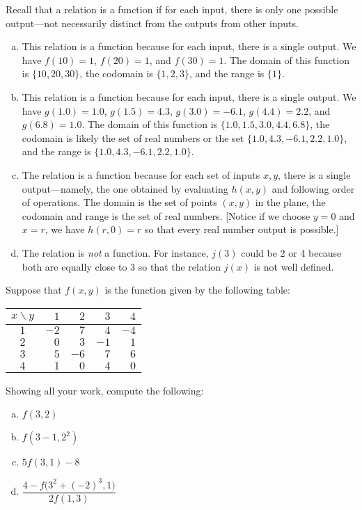 \documentclass[11pt,letterpaper]{article}
\begin{document}
\sol Recall that a relation is a function if for each input, there is only one possible output---not necessarily distinct from the outputs from other inputs. 

\begin{enumerate}[(a)]
\item This relation is a function because for each input, there is a single output. We have $f(10)= 1$, $f(20)= 1$, and $f(30)= 1$. The domain of this function is $\{ 10, 20, 30 \}$, the codomain is $\{ 1, 2, 3 \}$, and the range is $\{ 1 \}$. 

\item This relation is a function because for each input, there is a single output. We have $g(1.0)= 1.0$, $g(1.5)= 4.3$, $g(3.0)= -6.1$, $g(4.4)= 2.2$, and $g(6.8)= 1.0$. The domain of this function is $\{ 1.0, 1.5, 3.0, 4.4, 6.8 \}$, the codomain is likely the set of real numbers or the set $\{ 1.0, 4.3, -6.1, 2.2, 1.0 \}$, and the range is $\{ 1.0, 4.3, -6.1, 2.2, 1.0 \}$. 

\item The relation is a function because for each set of inputs $x, y$, there is a single output---namely, the one obtained by evaluating $h(x, y)$ and following order of operations. The domain is the set of points $(x, y)$ in the plane, the codomain and range is the set of real numbers. [Notice if we choose $y= 0$ and $x= r$, we have $h(r, 0)= r$ so that every real number output is possible.]

\item The relation is \textit{not} a function. For instance, $j(3)$ could be 2 or 4 because both are equally close to 3 so that the relation $j(x)$ is not well defined. 
\end{enumerate}



\newpage



 Suppose that $f(x, y)$ is the function given by the following table:
	\begin{table}[!ht]
	\centering
	\begin{tabular}{|c||r|r|r|r|} \hline 
	$x \backslash y$ & $1$ & $2$ & $3$ & $4$ \\ \hline \hline
	$1$ & $-2$ & $7$ & $4$ & $-4$ \\ \hline
	$2$ & $0$ & $3$ & $-1$ & $1$ \\ \hline
	$3$ & $5$ & $-6$ & $7$ & $6$ \\ \hline
	$4$ & $1$ & $0$ & $4$ & $0$ \\ \hline
	\end{tabular}
	\end{table} \par
Showing all your work, compute the following:
	\begin{enumerate}[(a)]
	\item $f(3, 2)$
	\item $f(3 - 1, 2^2)$
	\item $5 f(3, 1) - 8$
	\item $\dfrac{4 - f\big( 3^2 + (-2)^3, 1 \big) }{2 f(1, 3)}$
	\end{enumerate} \pspace
\end{document}
